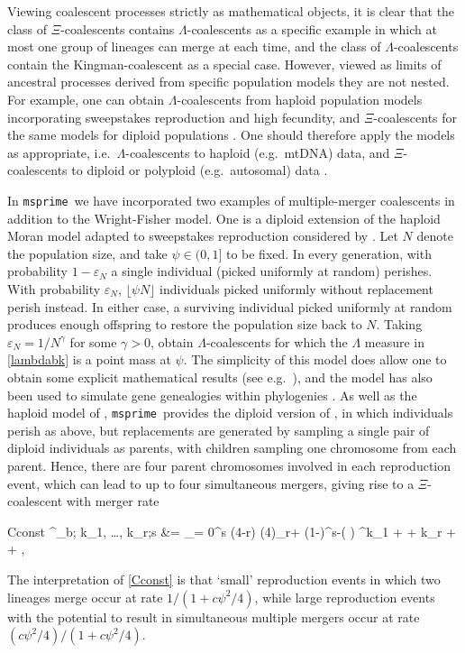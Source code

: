 \documentclass{article}
\newcommand{\msprime}[0]{\texttt{msprime}}
\begin{document}
Viewing coalescent processes strictly as mathematical
objects, it is clear that the class of $\Xi$-coalescents contains
$\Lambda$-coalescents as a specific example in which at most
one group of lineages can merge at each time, and the class of
$\Lambda$-coalescents contain the Kingman-coalescent as a special
case.  However, viewed as limits of ancestral processes derived from
specific population models they are not nested. For example, one can
obtain $\Lambda$-coalescents from haploid population models
incorporating sweepstakes reproduction and high fecundity,
and $\Xi$-coalescents for the same models for diploid populations \citep{BBE13}.
One should therefore apply the models as appropriate, i.e.\
$\Lambda$-coalescents to haploid (e.g.\ mtDNA) data,
and $\Xi$-coalescents to diploid or polyploid (e.g.\ autosomal) data \citep{blath2016site}.

In \msprime\ we have incorporated two examples of multiple-merger coalescents
in addition to the Wright-Fisher model. 
One is a diploid extension \citep{BBE13} of the haploid Moran model adapted
to sweepstakes reproduction considered by \cite{EW06}.
Let $N$ denote the population size, and take $\psi \in (0,1]$ to be fixed.
In every generation, with probability $1-\varepsilon_N$ a single individual
(picked uniformly at random) perishes.
With probability $\varepsilon_N$, $\lfloor \psi N \rfloor$ individuals picked uniformly
without replacement perish instead.
In either case, a surviving individual picked uniformly at random produces enough offspring
to restore the population size back to $N$.  Taking $\varepsilon_N =
1/N^\gamma$ for some $\gamma > 0$, \cite{EW06} obtain $\Lambda$-coalescents
for which the $\Lambda$ measure in \eqref{lambdabk} is a
point mass at $\psi$.  The simplicity of this model does allow one to obtain
some explicit mathematical results (see e.g.\
\cite{Der2012, EF2018,Freund2020,Matuszewski2017}), and the model has also been
used to simulate gene genealogies within phylogenies \citep{zhu2015hybrid}.
As well as the haploid model of \cite{EW06}, \msprime\ provides the diploid version
of \cite{BBE13}, in which individuals perish as above, but replacements are
generated by sampling a single pair of diploid individuals as parents, with
children sampling one chromosome from each parent.
Hence, there are four parent chromosomes involved in each reproduction event, which can lead to
up to four simultaneous mergers, giving rise to a $\Xi$-coalescent with merger rate
\begin{esplit}{Cconst} \lambda^{\text{Dirac}}_{b; k_1, \ldots,
k_r;s } &= \frac{c \psi^2 / 4}{1 + c \psi^2 / 4} \frac{4}{ \psi^2}\sum_{\ell = 0}^{s \wedge (4-r)} 
(4)_{r+\ell} (1-\psi)^{s-\ell }\left( \frac{\psi}{4} \right) ^{k_1 + \cdots +
k_r + \ell} + \frac{\one{r=1, k_1 = 2}}{1 + c \psi^2 / 4},  \\ \end{esplit}
The interpretation of \eqref{Cconst} is that `small' reproduction events in which
two lineages merge occur at rate $1/(1 + c\psi^2/4)$, while large reproduction events
with the potential to result in simultaneous multiple mergers occur at rate $(c\psi^2/4) / (1 + c\psi^2/4)$.
\end{document}
